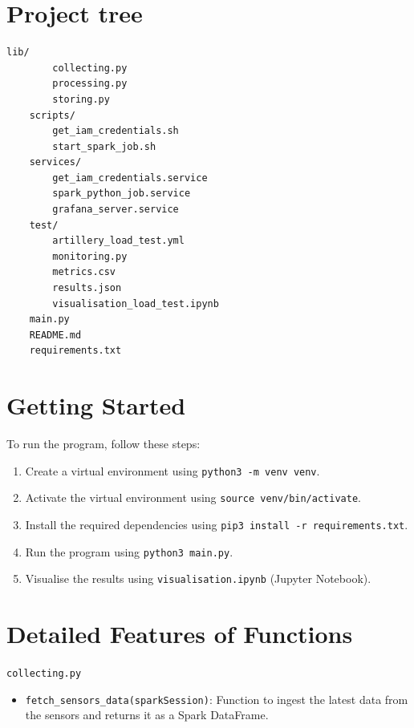 \documentclass[12pt,oneside]{book} %
\begin{document}
\begin{subappendices}
    \section{Project tree}
    \begin{lstlisting}[breaklines=true, basicstyle=\small]
    lib/
        collecting.py
        processing.py
        storing.py
    scripts/
        get_iam_credentials.sh
        start_spark_job.sh
    services/
        get_iam_credentials.service
        spark_python_job.service
        grafana_server.service
    test/
        artillery_load_test.yml
        monitoring.py
        metrics.csv
        results.json
        visualisation_load_test.ipynb
    main.py
    README.md
    requirements.txt
    \end{lstlisting}

    \section{Getting Started}
    To run the program, follow these steps:
    \begin{enumerate}
        \itemindent=17.87pt
        \item Create a virtual environment using \texttt{python3 -m venv venv}.
        \item Activate the virtual environment using \texttt{source venv/bin/activate}.
        \item Install the required dependencies using \texttt{pip3 install -r
                  requirements.txt}.
        \item Run the program using \texttt{python3 main.py}.
        \item Visualise the results using \texttt{visualisation.ipynb} (Jupyter Notebook).
    \end{enumerate}

    \section{Detailed Features of Functions}
    \begin{description}
        \item \texttt{collecting.py}
              \begin{itemize}
                  \item \texttt{fetch\_sensors\_data(sparkSession)}: Function to ingest the latest data from the sensors and returns it as a Spark DataFrame.
              \end{itemize}


\end{description}
\end{subappendices}
\end{document}
